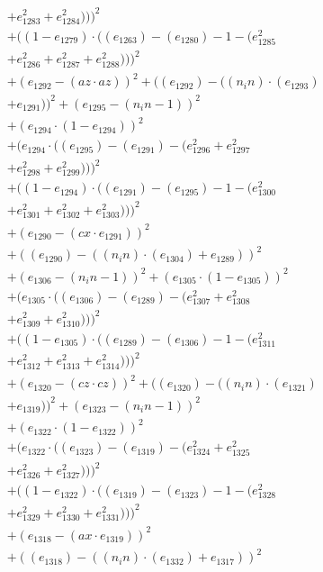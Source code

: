 \documentclass[10pt, a4paper]{article}
\begin{document}
\begin{small}
\begin{align*}
& + e_{1283}^{2} + e_{1284}^{2})))^{2} \\
& + ((1 - e_{1279})  \cdot  ((e_{1263}) - (e_{1280}) - 1 - (e_{1285}^{2} \\
& + e_{1286}^{2} + e_{1287}^{2} + e_{1288}^{2})))^{2} \\
& + (e_{1292} - (az  \cdot  az))^{2} + ((e_{1292}) - ((n_in)  \cdot  (e_{1293}) \\
& + e_{1291}))^{2} + (e_{1295} - (n_in - 1))^{2} \\
& + (e_{1294}  \cdot  (1 - e_{1294}))^{2} \\
& + (e_{1294}  \cdot  ((e_{1295}) - (e_{1291}) - (e_{1296}^{2} + e_{1297}^{2} \\
& + e_{1298}^{2} + e_{1299}^{2})))^{2} \\
& + ((1 - e_{1294})  \cdot  ((e_{1291}) - (e_{1295}) - 1 - (e_{1300}^{2} \\
& + e_{1301}^{2} + e_{1302}^{2} + e_{1303}^{2})))^{2} \\
& + (e_{1290} - (cx  \cdot  e_{1291}))^{2} \\
& + ((e_{1290}) - ((n_in)  \cdot  (e_{1304}) + e_{1289}))^{2} \\
& + (e_{1306} - (n_in - 1))^{2} + (e_{1305}  \cdot  (1 - e_{1305}))^{2} \\
& + (e_{1305}  \cdot  ((e_{1306}) - (e_{1289}) - (e_{1307}^{2} + e_{1308}^{2} \\
& + e_{1309}^{2} + e_{1310}^{2})))^{2} \\
& + ((1 - e_{1305})  \cdot  ((e_{1289}) - (e_{1306}) - 1 - (e_{1311}^{2} \\
& + e_{1312}^{2} + e_{1313}^{2} + e_{1314}^{2})))^{2} \\
& + (e_{1320} - (cz  \cdot  cz))^{2} + ((e_{1320}) - ((n_in)  \cdot  (e_{1321}) \\
& + e_{1319}))^{2} + (e_{1323} - (n_in - 1))^{2} \\
& + (e_{1322}  \cdot  (1 - e_{1322}))^{2} \\
& + (e_{1322}  \cdot  ((e_{1323}) - (e_{1319}) - (e_{1324}^{2} + e_{1325}^{2} \\
& + e_{1326}^{2} + e_{1327}^{2})))^{2} \\
& + ((1 - e_{1322})  \cdot  ((e_{1319}) - (e_{1323}) - 1 - (e_{1328}^{2} \\
& + e_{1329}^{2} + e_{1330}^{2} + e_{1331}^{2})))^{2} \\
& + (e_{1318} - (ax  \cdot  e_{1319}))^{2} \\
& + ((e_{1318}) - ((n_in)  \cdot  (e_{1332}) + e_{1317}))^{2} \\

\end{align*}
\end{small}
\end{document}
